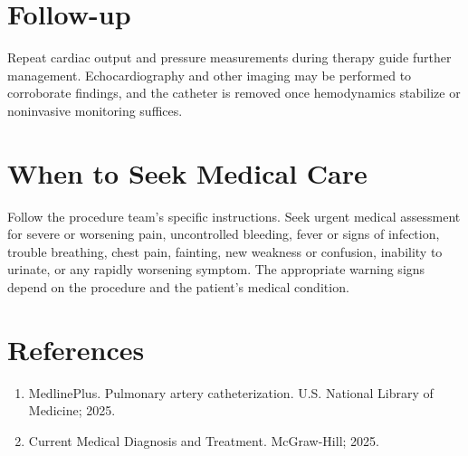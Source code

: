 \section*{Follow-up}
Repeat cardiac output and pressure measurements during therapy guide further management. Echocardiography and other imaging may be performed to corroborate findings, and the catheter is removed once hemodynamics stabilize or noninvasive monitoring suffices.

\section*{When to Seek Medical Care}
Follow the procedure team's specific instructions. Seek urgent medical assessment for severe or worsening pain, uncontrolled bleeding, fever or signs of infection, trouble breathing, chest pain, fainting, new weakness or confusion, inability to urinate, or any rapidly worsening symptom. The appropriate warning signs depend on the procedure and the patient's medical condition.

\section*{References}
\begin{enumerate}
  \item MedlinePlus. Pulmonary artery catheterization. U.S. National Library of Medicine; 2025.
  \item Current Medical Diagnosis and Treatment. McGraw-Hill; 2025.
\end{enumerate}

\clearpage
